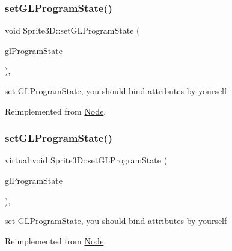 \subsubsection{\texorpdfstring{set\+G\+L\+Program\+State()}{setGLProgramState()}\hspace{0.1cm}{\footnotesize\ttfamily [1/2]}}
{\footnotesize\ttfamily void Sprite3\+D\+::set\+G\+L\+Program\+State (\begin{DoxyParamCaption}\item[{\hyperlink{classGLProgramState}{G\+L\+Program\+State} $\ast$}]{gl\+Program\+State }\end{DoxyParamCaption})\hspace{0.3cm}{\ttfamily [override]}, {\ttfamily [virtual]}}

set \hyperlink{classGLProgramState}{G\+L\+Program\+State}, you should bind attributes by yourself 

Reimplemented from \hyperlink{classNode_a3fe706d4e7b601eee9ccc8eb8ecf90c0}{Node}.

\mbox{\label{classSprite3D_a8bfa814ae2f4584b69dbb776de1c327b}} 
\subsubsection{\texorpdfstring{set\+G\+L\+Program\+State()}{setGLProgramState()}\hspace{0.1cm}{\footnotesize\ttfamily [2/2]}}
{\footnotesize\ttfamily virtual void Sprite3\+D\+::set\+G\+L\+Program\+State (\begin{DoxyParamCaption}\item[{\hyperlink{classGLProgramState}{G\+L\+Program\+State} $\ast$}]{gl\+Program\+State }\end{DoxyParamCaption})\hspace{0.3cm}{\ttfamily [override]}, {\ttfamily [virtual]}}

set \hyperlink{classGLProgramState}{G\+L\+Program\+State}, you should bind attributes by yourself 

Reimplemented from \hyperlink{classNode_a3fe706d4e7b601eee9ccc8eb8ecf90c0}{Node}.

\mbox{\label{classSprite3D_a0fa47c29a1b6e9cf7a0a2eaa45c1e43a}} 
